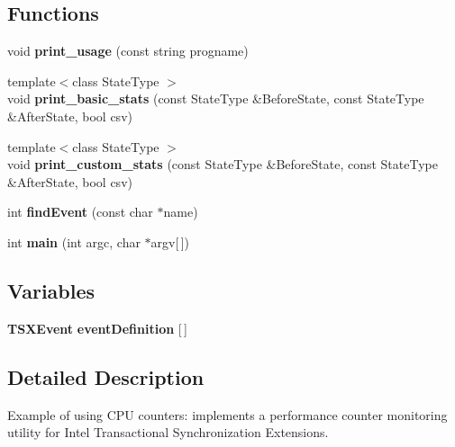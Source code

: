 \subsection*{Functions}
\begin{DoxyCompactItemize}
\item 
void {\bfseries print\+\_\+usage} (const string progname)\label{pcm-tsx_8cpp_a4e43544978d9afb2faf08dce11cab70c}

\item 
{\footnotesize template$<$class State\+Type $>$ }\\void {\bfseries print\+\_\+basic\+\_\+stats} (const State\+Type \&Before\+State, const State\+Type \&After\+State, bool csv)\label{pcm-tsx_8cpp_a5ded5e5cf069617e10262bf55eef2755}

\item 
{\footnotesize template$<$class State\+Type $>$ }\\void {\bfseries print\+\_\+custom\+\_\+stats} (const State\+Type \&Before\+State, const State\+Type \&After\+State, bool csv)\label{pcm-tsx_8cpp_a50e3da3c8c576ec27ac14afcb226717f}

\item 
int {\bfseries find\+Event} (const char $\ast$name)\label{pcm-tsx_8cpp_a6c01bd81dd058f924885a7ba93c94dcc}

\item 
int {\bfseries main} (int argc, char $\ast$argv[$\,$])\label{pcm-tsx_8cpp_a0ddf1224851353fc92bfbff6f499fa97}

\end{DoxyCompactItemize}
\subsection*{Variables}
\begin{DoxyCompactItemize}
\item 
{\bf T\+S\+X\+Event} {\bfseries event\+Definition} [$\,$]\label{pcm-tsx_8cpp_af6afa6575f1849ca84ef80ff04ba6e0a}

\end{DoxyCompactItemize}


\subsection{Detailed Description}
Example of using C\+P\+U counters\+: implements a performance counter monitoring utility for Intel Transactional Synchronization Extensions. 

